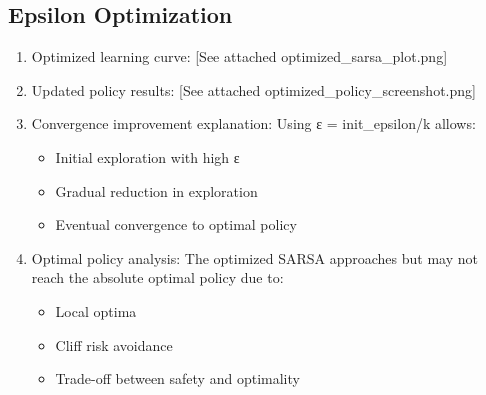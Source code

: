 \documentclass{article}
\begin{document}
\subsection{Epsilon Optimization}
\begin{enumerate}[label=(\arabic*)]
\item Optimized learning curve: [See attached optimized\_sarsa\_plot.png]

\item Updated policy results: [See attached optimized\_policy\_screenshot.png]

\item Convergence improvement explanation:
Using ε = init\_epsilon/k allows:
\begin{itemize}
    \item Initial exploration with high ε
    \item Gradual reduction in exploration
    \item Eventual convergence to optimal policy
\end{itemize}

\item Optimal policy analysis:
The optimized SARSA approaches but may not reach the absolute optimal policy due to:
\begin{itemize}
    \item Local optima
    \item Cliff risk avoidance
    \item Trade-off between safety and optimality
\end{itemize}
\end{enumerate}
\end{document}
